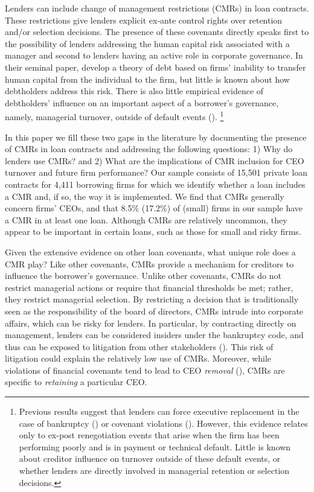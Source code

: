 \documentclass[a4paper,12pt]{article}
\begin{document}
\noindent
Lenders can include change of management restrictions (CMRs) in loan contracts.
These restrictions give lenders explicit ex-ante control rights over retention and/or selection decisions.
The presence of these covenants directly speaks first to the possibility of lenders addressing the human capital risk associated with a manager and second to lenders having an active role in corporate governance.
In their seminal paper, \citet{Hart_1994} develop a theory of debt based on firms' inability to transfer human capital from the individual to the firm, but little is known about how debtholders address this risk.
There is also little empirical evidence of debtholders' influence on an important aspect of a borrower's governance, namely, managerial turnover, outside of default events (\citet{Shleifer_1997, Roberts_2009b}).%
	\footnote{Previous results suggest that lenders can force executive replacement in the case of bankruptcy (\citet{Gilson_1989}) or covenant violations (\citet{Nini_2012}). However, this evidence relates only to ex-post renegotiation events that arise when the firm has been performing poorly and is in payment or technical default. Little is known about creditor influence on turnover outside of these default events, or whether lenders are directly involved in managerial retention or selection decisions.}


In this paper we fill these two gaps  in the literature by documenting the presence of CMRs in loan contracts and addressing the following questions: 1) Why do lenders use CMRs? and 2) What are the implications of CMR inclusion for CEO turnover and future firm performance?
Our sample consists of 15,501 private loan contracts for 4,411 borrowing firms for which we identify whether a loan includes a CMR and, if so, the way it is implemented.
We find that CMRs generally concern firms' CEOs, and that 8.5\% (17.2\%) of (small) firms in our sample have a CMR in at least one loan.
Although CMRs are relatively uncommon, they appear to be important in certain loans, such as those for small and risky firms.


Given the extensive evidence on other loan covenants, what unique role does a CMR play?
Like other covenants, CMRs provide a mechanism for creditors to influence the borrower's governance.
Unlike other covenants, CMRs do not restrict managerial actions or require that financial thresholds be met; rather, they restrict managerial selection.
By restricting a decision that is traditionally seen as the responsibility of the board of directors, CMRs intrude into corporate affairs, which can be risky for lenders.
In particular, by contracting directly on management, lenders can be considered insiders under the bankruptcy code, and thus can be exposed to litigation from other stakeholders (\citet{Leichtling_1997}).
This risk of litigation could explain the relatively low use of CMRs.
Moreover, while violations of financial covenants tend to lead to CEO \textit{removal} (\citet{Nini_2012}), CMRs are specific to \textit{retaining} a particular CEO.
\end{document}
